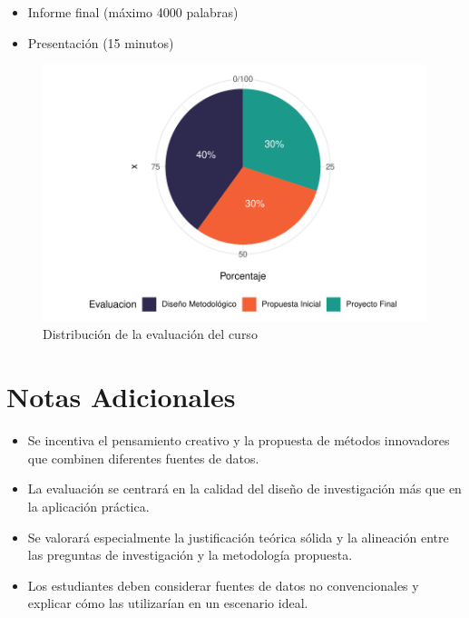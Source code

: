 \documentclass[11pt,letter,]{article}
\makeatletter
\providecommand{\tightlist}{%
  \setlength{\itemsep}{0pt}\setlength{\parskip}{0pt}}
\def\maxwidth{\ifdim\Gin@nat@width>\linewidth\linewidth
\else\Gin@nat@width\fi}
\let\Oldincludegraphics\includegraphics
\renewcommand{\includegraphics}[1]{\Oldincludegraphics[width=\maxwidth]{#1}}
\makeatother
\begin{document}
\begin{itemize}
\tightlist
\item
  Informe final (máximo 4000 palabras)
\item
  Presentación (15 minutos)
\end{itemize}

\begin{figure}

{\centering \includegraphics{programa_files/figure-pdf/unnamed-chunk-1-1.pdf}

}

\caption{Distribución de la evaluación del curso}

\end{figure}

\hypertarget{notas-adicionales}{%
\section{Notas Adicionales}\label{notas-adicionales}}

\begin{tcolorbox}[enhanced jigsaw, arc=.35mm, leftrule=.75mm, bottomrule=.15mm, title=\textcolor{quarto-callout-note-color}{\faInfo}\hspace{0.5em}{Note}, coltitle=black, opacityback=0, toprule=.15mm, titlerule=0mm, breakable, rightrule=.15mm, colframe=quarto-callout-note-color-frame, left=2mm, colbacktitle=quarto-callout-note-color!10!white, toptitle=1mm, opacitybacktitle=0.6, bottomtitle=1mm, colback=white]

\begin{itemize}
\tightlist
\item
  Se incentiva el pensamiento creativo y la propuesta de métodos
  innovadores que combinen diferentes fuentes de datos.
\item
  La evaluación se centrará en la calidad del diseño de investigación
  más que en la aplicación práctica.
\item
  Se valorará especialmente la justificación teórica sólida y la
  alineación entre las preguntas de investigación y la metodología
  propuesta.
\item
  Los estudiantes deben considerar fuentes de datos no convencionales y
  explicar cómo las utilizarían en un escenario ideal.
\end{itemize}

\end{tcolorbox}
\end{document}
